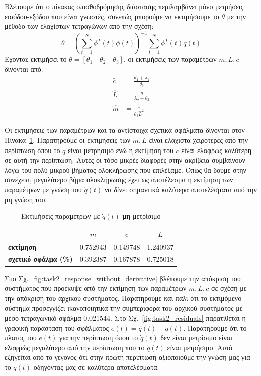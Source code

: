 \documentclass[a4paper,12pt]{article}
\begin{document}
Βλέπουμε ότι ο πίνακας οπισθοδρόμησης διάστασης περιλαμβάνει μόνο μετρήσεις εισόδου-εξόδου που είναι γνωστές,
συνεπώς μπορούμε να εκτιμήσουμε το $\theta$ με την μέθοδο των ελαχίστων
τετραγώνων από την σχέση:
\begin{equation}
    \theta = \left(\sum_{t=1}^N\phi^T(t)\phi(t)\right)^{-1}\sum_{t=1}^N\phi^T(t)q(t)
\end{equation}
Έχοντας εκτιμήσει το $\theta = [\theta_1 \quad \theta_2 \quad \theta_3]$, οι εκτιμήσεις των παραμέτρων $m, L, c$
δίνονται από:
\begin{equation}
    \begin{aligned}
        \hat{c} &= \frac{\theta_1 + \lambda_1}{\theta_3} \\
        \hat{L} &= \frac{g}{\lambda_2 + \theta_2} \\
        \hat{m} &= \frac{1}{\theta_3 \hat{L}^2}
    \end{aligned}
\end{equation}

Οι εκτιμήσεις των παραμέτρων και τα αντίστοιχα σχετικά σφάλματα δίνονται στον 
Πίνακα~\ref{tab:task2_estimations_without_derivative}. Παρατηρούμε οι εκτιμήσεις των
$m, L$ είναι ελάχιστα χειρότερες από την περίπτωση όπου το $\dot{q}$ είναι μετρήσιμο ενώ η εκτίμηση
του $c$ είναι ελαφρώς καλύτερη σε αυτή την περίπτωση. Αυτές οι τόσο μικρές διαφορές στην ακρίβεια συμβαίνουν
λόγω του πολύ μικρού βήματος ολοκλήρωσης που επιλέξαμε. Όπως θα δούμε στην συνέχεια, μεγαλύτερο βήμα ολοκλήρωσης
έχει ως αποτέλεσμα η εκτίμηση των παραμέτρων με γνώση του $\dot{q}(t)$ να δίνει σημαντικά καλύτερα αποτελέσματα από
την μη γνώση του.

\begin{table}[h!]
\centering
\begin{tabular}{|l|c|c|c|}
\hline
\multicolumn{1}{|c|}{} & \multicolumn{1}{c|}{$m$} & \multicolumn{1}{c|}{$c$} & \multicolumn{1}{c|}{$L$} \\
\hline
\textbf{εκτίμηση} & 0.752943 & 0.149748 & 1.240937 \\
\textbf{σχετικό σφάλμα (\%)} & 0.392387 & 0.167878 & 0.725018 \\
\hline
\end{tabular}
\caption{Εκτιμήσεις παραμέτρων με $\dot{q}(t)$ \textbf{μη} μετρίσιμο}
\label{tab:task2_estimations_without_derivative}
\end{table}

Στο Σχ.~\ref{fig:task2_response_without_derivative} βλέπουμε την απόκριση του συστήματος που προέκυψε από την
εκτίμηση των παραμέτρων $m, L, c$ σε σχέση με την απόκριση του αρχικού συστήματος. Παρατηρούμε και πάλι ότι το 
εκτιμόμενο σύστημα προσεγγίζει ικανοποιητικά την συμπεριφορά του αρχικού συστήματος με μέσο τετραγωνικό 
σφάλμα 0.021544. Στο Σχ.~\ref{fig:task2_residuals} παρατίθεται
η γραφική παράσταση του σφάλματος $e(t) = q(t) - \dot{q}(t)$. Παρατηρούμε ότι το πλατος του $e(t)$
για την περίπτωση όπου το $\dot{q}(t)$ δεν είναι μετρίσιμο είναι ελαφρώς μεγαλύτερο από την περίπτωση που το 
$\dot{q}(t)$ είναι μετρήσιμο. Αυτό εξηγείται από το γεγονός ότι στην πρώτη περίπτωση αξιοποιούμε την γνώση μας
για το $\dot{q}(t)$ οδηγόντας μας σε καλύτερα αποτελέσματα.
\end{document}
